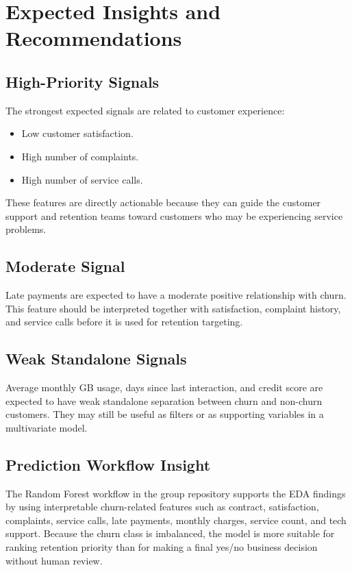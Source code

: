 \section{Expected Insights and Recommendations}

\subsection{High-Priority Signals}
The strongest expected signals are related to customer experience:
\begin{itemize}
  \item Low customer satisfaction.
  \item High number of complaints.
  \item High number of service calls.
\end{itemize}
These features are directly actionable because they can guide the customer
support and retention teams toward customers who may be experiencing service
problems.

\subsection{Moderate Signal}
Late payments are expected to have a moderate positive relationship with churn.
This feature should be interpreted together with satisfaction, complaint
history, and service calls before it is used for retention targeting.

\subsection{Weak Standalone Signals}
Average monthly GB usage, days since last interaction, and credit score are
expected to have weak standalone separation between churn and non-churn
customers. They may still be useful as filters or as supporting variables in a
multivariate model.

\subsection{Prediction Workflow Insight}
The Random Forest workflow in the group repository supports the EDA findings by
using interpretable churn-related features such as contract, satisfaction,
complaints, service calls, late payments, monthly charges, service count, and
tech support. Because the churn class is imbalanced, the model is more suitable
for ranking retention priority than for making a final yes/no business decision
without human review.

